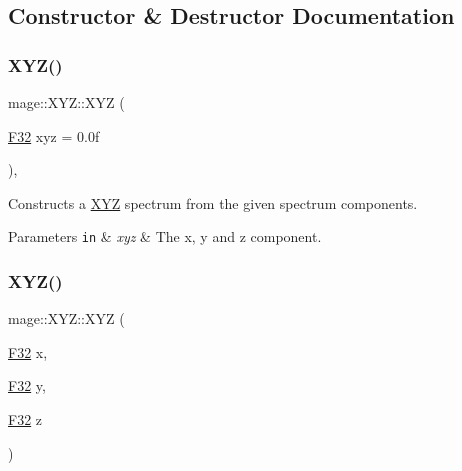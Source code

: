 \subsection{Constructor \& Destructor Documentation}
\hypertarget{structmage_1_1_x_y_z_a58174831ba4a113e57559dce3cd04224}{}\label{structmage_1_1_x_y_z_a58174831ba4a113e57559dce3cd04224} 
\subsubsection{\texorpdfstring{X\+Y\+Z()}{XYZ()}\hspace{0.1cm}{\footnotesize\ttfamily [1/7]}}
{\footnotesize\ttfamily mage\+::\+X\+Y\+Z\+::\+X\+YZ (\begin{DoxyParamCaption}\item[{\hyperlink{namespacemage_aa97e833b45f06d60a0a9c4fc22ae02c0}{F32}}]{xyz = {\ttfamily 0.0f} }\end{DoxyParamCaption})\hspace{0.3cm}{\ttfamily [explicit]}, {\ttfamily [noexcept]}}

Constructs a \hyperlink{structmage_1_1_x_y_z}{X\+YZ} spectrum from the given spectrum components.


\begin{DoxyParams}[1]{Parameters}
\mbox{\tt in}  & {\em xyz} & The x, y and z component. \\
\hline
\end{DoxyParams}
\hypertarget{structmage_1_1_x_y_z_a842b9dd1624236c5699c6f57b400cbeb}{}\label{structmage_1_1_x_y_z_a842b9dd1624236c5699c6f57b400cbeb} 
\subsubsection{\texorpdfstring{X\+Y\+Z()}{XYZ()}\hspace{0.1cm}{\footnotesize\ttfamily [2/7]}}
{\footnotesize\ttfamily mage\+::\+X\+Y\+Z\+::\+X\+YZ (\begin{DoxyParamCaption}\item[{\hyperlink{namespacemage_aa97e833b45f06d60a0a9c4fc22ae02c0}{F32}}]{x,  }\item[{\hyperlink{namespacemage_aa97e833b45f06d60a0a9c4fc22ae02c0}{F32}}]{y,  }\item[{\hyperlink{namespacemage_aa97e833b45f06d60a0a9c4fc22ae02c0}{F32}}]{z }\end{DoxyParamCaption})\hspace{0.3cm}{\ttfamily [noexcept]}}

